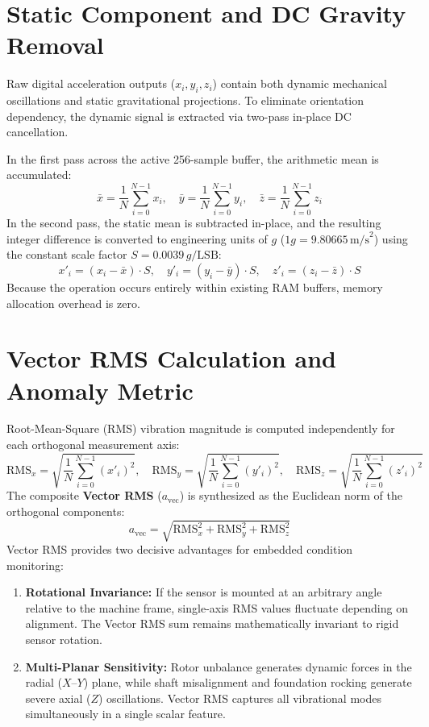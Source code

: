 \section{Static Component and DC Gravity Removal}
Raw digital acceleration outputs ($x_i, y_i, z_i$) contain both dynamic mechanical oscillations and static gravitational projections. To eliminate orientation dependency, the dynamic signal is extracted via two-pass in-place DC cancellation.

In the first pass across the active 256-sample buffer, the arithmetic mean is accumulated:
\begin{equation}
\bar{x} = \frac{1}{N} \sum_{i=0}^{N-1} x_i, \quad \bar{y} = \frac{1}{N} \sum_{i=0}^{N-1} y_i, \quad \bar{z} = \frac{1}{N} \sum_{i=0}^{N-1} z_i
\end{equation}
In the second pass, the static mean is subtracted in-place, and the resulting integer difference is converted to engineering units of $g$ ($1g = 9.80665\,\text{m/s}^2$) using the constant scale factor $S = 0.0039\,g/\text{LSB}$:
\begin{equation}
x'_i = (x_i - \bar{x}) \cdot S, \quad y'_i = (y_i - \bar{y}) \cdot S, \quad z'_i = (z_i - \bar{z}) \cdot S
\end{equation}
Because the operation occurs entirely within existing RAM buffers, memory allocation overhead is zero.

\section{Vector RMS Calculation and Anomaly Metric}
Root-Mean-Square (RMS) vibration magnitude is computed independently for each orthogonal measurement axis:
\begin{equation}
\mathrm{RMS}_x = \sqrt{\frac{1}{N} \sum_{i=0}^{N-1} (x'_i)^2}, \quad \mathrm{RMS}_y = \sqrt{\frac{1}{N} \sum_{i=0}^{N-1} (y'_i)^2}, \quad \mathrm{RMS}_z = \sqrt{\frac{1}{N} \sum_{i=0}^{N-1} (z'_i)^2}
\end{equation}
The composite \textbf{Vector RMS} ($a_{\mathrm{vec}}$) is synthesized as the Euclidean norm of the orthogonal components:
\begin{equation}
a_{\mathrm{vec}} = \sqrt{\mathrm{RMS}_x^2 + \mathrm{RMS}_y^2 + \mathrm{RMS}_z^2}
\label{eq:firmware_vec_rms}
\end{equation}
Vector RMS provides two decisive advantages for embedded condition monitoring:
\begin{enumerate}
    \item \textbf{Rotational Invariance:} If the sensor is mounted at an arbitrary angle relative to the machine frame, single-axis RMS values fluctuate depending on alignment. The Vector RMS sum remains mathematically invariant to rigid sensor rotation.
    \item \textbf{Multi-Planar Sensitivity:} Rotor unbalance generates dynamic forces in the radial ($X\text{--}Y$) plane, while shaft misalignment and foundation rocking generate severe axial ($Z$) oscillations. Vector RMS captures all vibrational modes simultaneously in a single scalar feature.
\end{enumerate}

